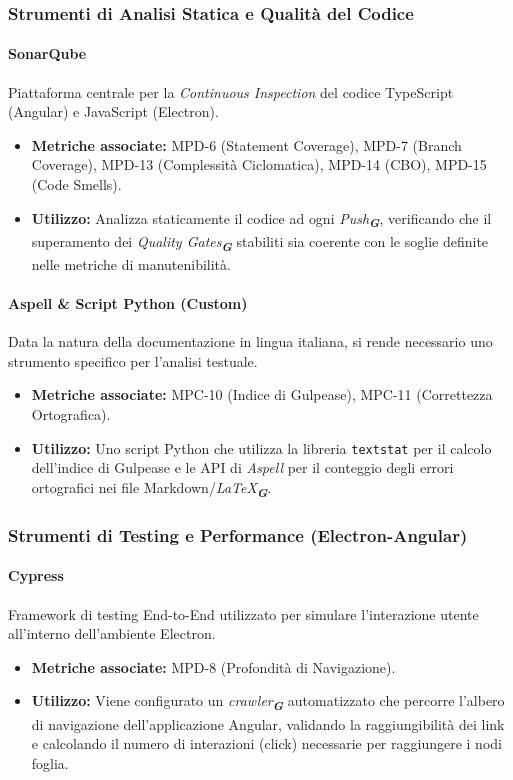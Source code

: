 \documentclass[a4paper,12pt]{article}
\newcommand{\glossario}[1]{\textit{#1}\textsubscript{\textbf{\textit{\textcolor{lightblack}{G}}}}}
\begin{document}
\subsubsection{Strumenti di Analisi Statica e Qualità del Codice}

\paragraph{SonarQube}
Piattaforma centrale per la \textit{Continuous Inspection} del codice TypeScript (Angular) e JavaScript (Electron).
\begin{itemize}
    \item \textbf{Metriche associate:} MPD-6 (Statement Coverage), MPD-7 (Branch Coverage), MPD-13 (Complessità Ciclomatica), MPD-14 (CBO), MPD-15 (Code Smells).
    \item \textbf{Utilizzo:} Analizza staticamente il codice ad ogni \glossario{Push}, verificando che il superamento dei \glossario{Quality Gates} stabiliti sia coerente con le soglie definite nelle metriche di manutenibilità.
\end{itemize}

\paragraph{Aspell \& Script Python (Custom)}
Data la natura della documentazione in lingua italiana, si rende necessario uno strumento specifico per l'analisi testuale.
\begin{itemize}
    \item \textbf{Metriche associate:} MPC-10 (Indice di Gulpease), MPC-11 (Correttezza Ortografica).
    \item \textbf{Utilizzo:} Uno script Python che utilizza la libreria \texttt{textstat} per il calcolo dell'indice di Gulpease e le API di \textit{Aspell} per il conteggio degli errori ortografici nei file Markdown/\glossario{LaTeX}.
\end{itemize}

\subsubsection{Strumenti di Testing e Performance (Electron-Angular)}

\paragraph{Cypress}
Framework di testing End-to-End utilizzato per simulare l'interazione utente all'interno dell'ambiente Electron.
\begin{itemize}
    \item \textbf{Metriche associate:} MPD-8 (Profondità di Navigazione).
    \item \textbf{Utilizzo:} Viene configurato un \glossario{crawler} automatizzato che percorre l'albero di navigazione dell'applicazione Angular, validando la raggiungibilità dei link e calcolando il numero di interazioni (click) necessarie per raggiungere i nodi foglia.
\end{itemize}
\end{document}
